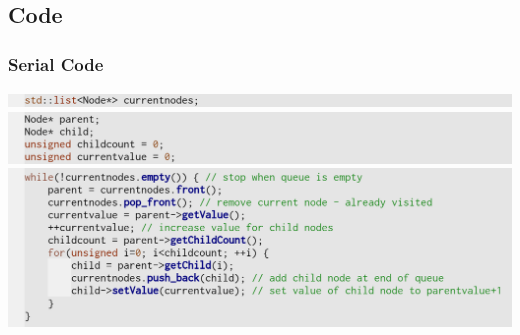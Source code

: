 \subsection{Code}
\begin{frame}
	\frametitle{Serial Code}
	\begin{center}
		\includegraphics[width=\textwidth]{img/code1} \\
		\includegraphics[width=\textwidth]{img/code2} \\
		\pause
		\includegraphics[width=\textwidth]{img/code3}
	\end{center}
\end{frame}


